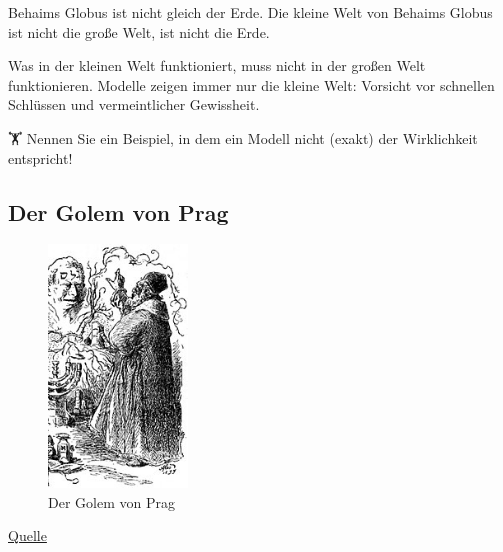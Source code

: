 \documentclass[
  a4paper,
  DIV=11]{scrreprt}
\theoremstyle{definition}
\theoremstyle{remark}
\begin{document}
\begin{tcolorbox}[enhanced jigsaw, leftrule=.75mm, toptitle=1mm, bottomtitle=1mm, titlerule=0mm, breakable, colframe=quarto-callout-note-color-frame, title=\textcolor{quarto-callout-note-color}{\faInfo}\hspace{0.5em}{Hinweis}, rightrule=.15mm, colback=white, arc=.35mm, left=2mm, bottomrule=.15mm, coltitle=black, opacitybacktitle=0.6, toprule=.15mm, colbacktitle=quarto-callout-note-color!10!white, opacityback=0]
Behaims Globus ist nicht gleich der Erde. Die kleine Welt von Behaims
Globus ist nicht die große Welt, ist nicht die Erde.
\end{tcolorbox}

Was in der kleinen Welt funktioniert, muss nicht in der großen Welt
funktionieren. Modelle zeigen immer nur die kleine Welt: Vorsicht vor
schnellen Schlüssen und vermeintlicher Gewissheit.

🏋 Nennen Sie ein Beispiel, in dem ein Modell nicht (exakt) der
Wirklichkeit entspricht!

\hypertarget{der-golem-von-prag}{%
\subsection{Der Golem von Prag}\label{der-golem-von-prag}}

\begin{figure}

{\centering \includegraphics[width=0.33\textwidth,height=\textheight]{./img/170px-Golem_and_Loew.jpg}

}

\caption{\label{fig-golem-prag}Der Golem von Prag}

\end{figure}

\href{https://de.wikipedia.org/wiki/Golem}{Quelle}
\end{document}
